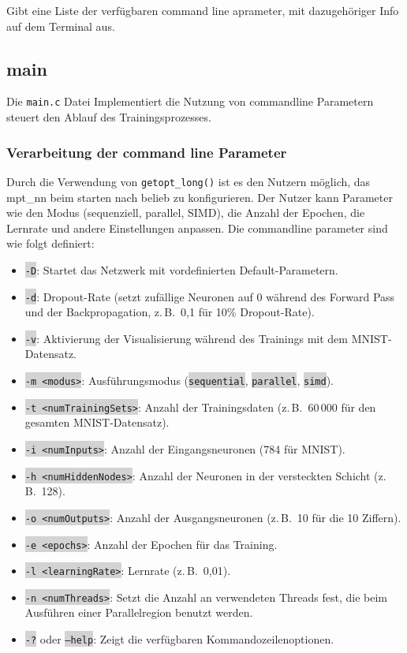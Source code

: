 \documentclass[a4paper, 12pt]{article}
\newcommand{\option}[1]{\colorbox{lightgray}{\texttt{#1}}}
\begin{document}
Gibt eine Liste der verfügbaren command line aprameter, mit dazugehöriger Info auf dem Terminal aus.

\subsection{main}
\label{subsec:main}

Die \texttt{main.c} Datei Implementiert die Nutzung von commandline Parametern steuert den Ablauf des Trainingsprozesses.

\subsubsection{Verarbeitung der command line Parameter}

Durch die Verwendung von \texttt{getopt\_long()} ist es den Nutzern möglich, das mpt\_nn beim starten nach belieb zu konfigurieren. 
Der Nutzer kann Parameter wie den Modus (sequenziell, parallel, SIMD), die Anzahl der Epochen, die Lernrate und andere Einstellungen anpassen.
Die commandline parameter sind wie folgt definiert:
\begin{itemize}
    \item \option{-D}: Startet das Netzwerk mit vordefinierten Default-Parametern.
    \item \option{-d}: Dropout-Rate (setzt zufällige Neuronen auf 0 während des Forward Pass und der Backpropagation, z.\,B.\ 0{,}1 für 10\% Dropout-Rate).
    \item \option{-v}: Aktivierung der Visualisierung während des Trainings mit dem MNIST-Datensatz.
    \item \option{-m~\textless{}modus\textgreater{}}: Ausführungsmodus (\option{sequential}, \option{parallel}, \option{simd}).
    \item \option{-t~\textless{}numTrainingSets\textgreater{}}: Anzahl der Trainingsdaten (z.\,B.\ 60\,000 für den gesamten MNIST-Datensatz).
    \item \option{-i~\textless{}numInputs\textgreater{}}: Anzahl der Eingangsneuronen (784 für MNIST).
    \item \option{-h~\textless{}numHiddenNodes\textgreater{}}: Anzahl der Neuronen in der versteckten Schicht (z.\,B.\ 128).
    \item \option{-o~\textless{}numOutputs\textgreater{}}: Anzahl der Ausgangsneuronen (z.\,B.\ 10 für die 10 Ziffern).
    \item \option{-e~\textless{}epochs\textgreater{}}: Anzahl der Epochen für das Training.
    \item \option{-l~\textless{}learningRate\textgreater{}}: Lernrate (z.\,B.\ 0{,}01).
    \item \option{-n~\textless{}numThreads\textgreater{}}: Setzt die Anzahl an verwendeten Threads fest, die beim Ausführen einer Parallelregion benutzt werden.
    \item \option{-?} oder \option{---help}: Zeigt die verfügbaren Kommandozeilenoptionen.
\end{itemize}
\end{document}
